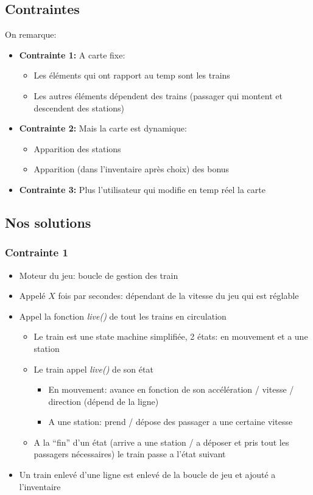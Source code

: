 \documentclass[report, backcover, french, nodocumentinfo]{upmethodology-document}
\begin{document}
			\subsection{Contraintes}
			On remarque:
			\begin{itemize}
				\item \textbf{Contrainte 1:} A carte fixe:
					\begin{itemize}
						\item Les éléments qui ont rapport au temp sont les trains
						\item Les autres éléments dépendent des trains (passager qui montent et descendent des stations)
					\end{itemize}
				\item \textbf{Contrainte 2:} Mais la carte est dynamique:
					\begin{itemize}
						\item Apparition des stations
						\item Apparition (dans l'inventaire après choix) des bonus
					\end{itemize}
				\item \textbf{Contrainte 3:} Plus l'utilisateur qui modifie en temp réel la carte
			\end{itemize}
			\subsection{Nos solutions}
				\subsubsection{Contrainte 1}
					\begin{itemize}
						\item Moteur du jeu: boucle de gestion des train
						\item Appelé $X$ fois par secondes: dépendant de la vitesse du jeu qui est réglable
						\item Appel la fonction \textit{live()} de tout les trains en circulation
							\begin{itemize}
								\item Le train est une state machine simplifiée, 2 états: en mouvement et a une station
								\item Le train appel \textit{live()} de son état
									\begin{itemize}
										\item En mouvement: avance en fonction de son accélération / vitesse / direction (dépend de la ligne)
										\item A une station: prend / dépose des passager a une certaine vitesse
									\end{itemize}
								\item A la ``fin'' d'un état (arrive a une station / a déposer et pris tout les passagers nécessaires) le train passe a l'état suivant
							\end{itemize}
						\item Un train enlevé d'une ligne est enlevé de la boucle de jeu et ajouté a l'inventaire
					\end{itemize}
\end{document}
